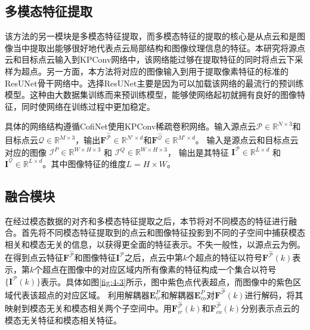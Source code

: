     \subsection{多模态特征提取}
    该方法的另一模块是多模态特征提取，而多模态特征的提取的核心是从点云和是图像当中提取出能够很好地代表点云局部结构和图像纹理信息的特征。本研究将源点云和目标点云输入到KPConv网络中，该网络能过够在提取特征的同时将点云下采样为超点。另一方面，本方法将对应的图像输入到用于提取像素特征的标准的ResUNet骨干网络中。选择ResUNet主要是因为可以加载该网络的最流行的预训练模型。这种由大数据集训练而来预训练模型，能够使网络起初就拥有良好的图像特征，同时使网络在训练过程中更加稳定。

    具体的网络结构遵循CofiNet使用KPConv稀疏卷积网络。输入源点云$\mathcal{P} \in \mathbb{R}^{N \times 3}$和目标点云$\mathcal{Q} \in \mathbb{R}^{M \times 3}$，输出$\mathbf{F}^{\hat{\mathcal{P}}} \in \mathbb{R}^{N' \times d}$和$\mathbf{F}^{\hat{\mathcal{Q}}} \in \mathbb{R}^{M' \times d}$。
    输入是源点云和目标点云对应的图像
    $\mathcal{I}^P \in \mathbb{R}^{W \times H \times 3}$ 和
    $\mathcal{I}^Q \in \mathbb{R}^{W \times H \times 3}$，
    输出是其特征
    $\mathbf{I}^{\mathcal{P}} \in \mathbb{R}^{L \times d}$ 和
    $\mathbf{I}^{\mathcal{Q}} \in \mathbb{R}^{L \times d}$。其中图像特征的维度$L = H \times W$。

    \subsection{融合模块}
    在经过模态数据的对齐和多模态特征提取之后，本节将对不同模态的特征进行融合。首先将不同模态特征提取到的点云和图像特征投影到不同的子空间中捕获模态相关和模态无关的信息，以获得更全面的特征表示。不失一般性，以源点云为例。在得到点云特征$\mathbf{F}^{\hat{\mathcal{P}}}$和图像特征$\mathbf{I}^{\mathcal{P}}$之后，点云中第$k$个超点的特征以符号$\mathbf{F}^{\hat{\mathcal{P}}}(k)$表示，第$k$个超点在图像中的对应区域内所有像素的特征构成一个集合以符号$\{\mathbf{I}^{\mathcal{P}}(k)\}$表示。具体如图\ref{fig:4-3}所示，图中紫色点代表超点，而图像中的紫色区域代表该超点的对应区域。
    利用解耦器$\mathbf{E}^{P}_{ir}$和解耦器$\mathbf{E}^{P}_{co}$对$\mathbf{F}^{\hat{\mathcal{P}}}(k)$进行解码，将其映射到模态无关和模态相关两个子空间中。用$\mathbf{F}^{\hat{\mathcal{P}}}_{ir}(k)$和$\mathbf{F}^{\hat{\mathcal{P}}}_{co}(k)$分别表示点云的模态无关特征和模态相关特征。

